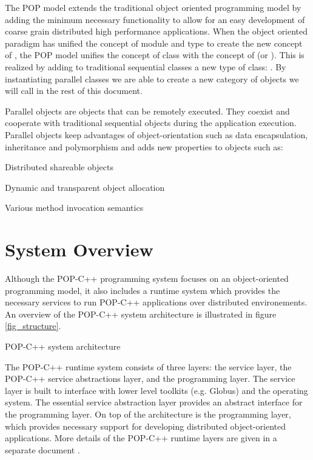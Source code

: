 The POP model extends the traditional object oriented programming model
by adding the minimum necessary functionality to allow for an easy development
of coarse grain distributed high performance applications.
When the object oriented paradigm has unified the concept of module and type to
create the new concept of , the POP model unifies the concept
of class with the concept of  (or ). This
is realized by adding to traditional sequential classes a new type of class:
. By instantiating parallel classes we are able
to create a new category of objects we will call 
in the rest of this document.

Parallel objects are objects that can be remotely executed. They coexist and
cooperate with traditional sequential objects during the application execution.
Parallel objects keep advantages of object-orientation such as data
encapsulation, inheritance and polymorphism and adds new properties to
objects such as:

\begin{petitem}

	\item Distributed shareable objects

	\item Dynamic and transparent object allocation

	\item Various method invocation semantics

\end{petitem}


\section{System Overview}


Although the POP-C++ programming system focuses on an object-oriented
programming model, it also includes a runtime system which provides the necessary services to run POP-C++ applications over distributed environements. 
An overview of the POP-C++ system architecture is illustrated in figure \ref{fig_structure}.

{POP-C++ system architecture}

The POP-C++ runtime system consists of three layers: the service layer,
the POP-C++ service abstractions layer, and the programming layer. The
service layer is built to interface with lower level toolkits (e.g.
Globus) and the operating system. The essential service abstraction layer
provides an abstract interface for the programming layer. On top of the
architecture is the programming layer, which provides necessary support
for developing distributed object-oriented applications. More details of
the POP-C++ runtime layers are given in a separate document \cite{Nguyen04}.

